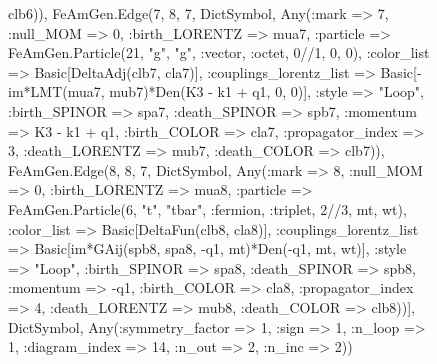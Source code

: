 \documentclass{revtex4}
\begin{document}
\begin{figure}[!htb]
\begin{center}
{clb6)), FeAmGen.Edge(7, 8, 7, Dict{Symbol, Any}(:mark => 7, :null_MOM => 0, :birth_LORENTZ => mua7, :particle => FeAmGen.Particle(21, "g", "g", :vector, :octet, 0//1, 0, 0), :color_list => Basic[DeltaAdj(clb7, cla7)], :couplings_lorentz_list => Basic[-im*LMT(mua7, mub7)*Den(K3 - k1 + q1, 0, 0)], :style => "Loop", :birth_SPINOR => spa7, :death_SPINOR => spb7, :momentum => K3 - k1 + q1, :birth_COLOR => cla7, :propagator_index => 3, :death_LORENTZ => mub7, :death_COLOR => clb7)), FeAmGen.Edge(8, 8, 7, Dict{Symbol, Any}(:mark => 8, :null_MOM => 0, :birth_LORENTZ => mua8, :particle => FeAmGen.Particle(6, "t", "tbar", :fermion, :triplet, 2//3, mt, wt), :color_list => Basic[DeltaFun(clb8, cla8)], :couplings_lorentz_list => Basic[im*GAij(spb8, spa8, -q1, mt)*Den(-q1, mt, wt)], :style => "Loop", :birth_SPINOR => spa8, :death_SPINOR => spb8, :momentum => -q1, :birth_COLOR => cla8, :propagator_index => 4, :death_LORENTZ => mub8, :death_COLOR => clb8))], Dict{Symbol, Any}(:symmetry_factor => 1, :sign => 1, :n_loop => 1, :diagram_index => 14, :n_out => 2, :n_inc => 2)) 
}
\end{center}
\end{figure}
\end{document}
